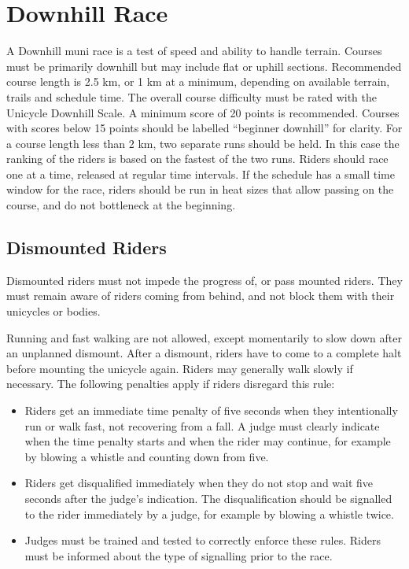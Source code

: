 \section{Downhill Race \label{sec:muni_downhill}}
A Downhill muni race is a test of speed and ability to handle terrain.
Courses must be primarily downhill but may include flat or uphill sections.
Recommended course length is 2.5 km, or 1 km at a minimum, depending on available terrain, trails and schedule time.
The overall course difficulty must be rated with the Unicycle Downhill Scale.
A minimum score of 20 points is recommended.
Courses with scores below 15 points should be labelled ``beginner downhill'' for clarity.
For a course length less than 2 km, two separate runs should be held.
In this case the ranking of the riders is based on the fastest of the two runs.
Riders should race one at a time, released at regular time intervals.
If the schedule has a small time window for the race, riders should be run in heat sizes that allow passing on the course, and do not bottleneck at the beginning.

\subsection{Dismounted Riders}
Dismounted riders must not impede the progress of, or pass mounted riders.
They must remain aware of riders coming from behind, and not block them with their
unicycles or bodies.

Running and fast walking are not allowed, except momentarily to slow down after an unplanned dismount.
After a dismount, riders have to come to a complete halt before mounting the unicycle again.
Riders may generally walk slowly if necessary.
The following penalties apply if riders disregard this rule:
\begin{itemize}
\item Riders get an immediate time penalty of five seconds when they intentionally run or walk fast, not recovering from a fall.
A judge must clearly indicate when the time penalty starts and when the rider may continue, for example by blowing a whistle and counting down from five.
\item Riders get disqualified immediately when they do not stop and wait five seconds after the judge's indication.
The disqualification should be signalled to the rider immediately by a judge, for example by blowing a whistle twice.
\item Judges must be trained and tested to correctly enforce these rules.
Riders must be informed about the type of signalling prior to the race.
\end{itemize}

